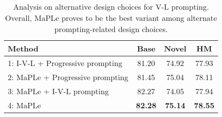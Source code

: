 \documentclass[10pt,twocolumn,letterpaper]{article}
\newcommand{\tablestyle}[2]{\setlength{\tabcolsep}{#1}\renewcommand{\arraystretch}{#2}\centering\footnotesize}
\begin{document}
\begin{table}[h!]
\tablestyle{6pt}{1.1}
\addtolength{\tabcolsep}{-4.5pt}
\centering
\begin{tabular}{l ccc}
\toprule
Method  & Base & Novel & HM\\
\midrule
1: I-V-L + Progressive prompting &	81.20 & 74.92 &	77.93\\
2: MaPLe + Progressive prompting & 81.45 & 75.04 & 78.11\\
3: MaPLe + I-V-L prompting & 82.27 & 74.05 & 77.94\\
\midrule
\rowcolor{tabhighlight}
4: MaPLe  &	\textbf{82.28} &	\textbf{75.14} &	\textbf{78.55}\\
\bottomrule
\end{tabular}
\caption{
Analysis on alternative design choices for V-L prompting. Overall, MaPLe proves to be the best variant among alternate prompting-related design choices.  
} 
\label{table:other_design_variants_ablation}
\end{table}








\label{appendix:additional_analysis}
\end{document}

